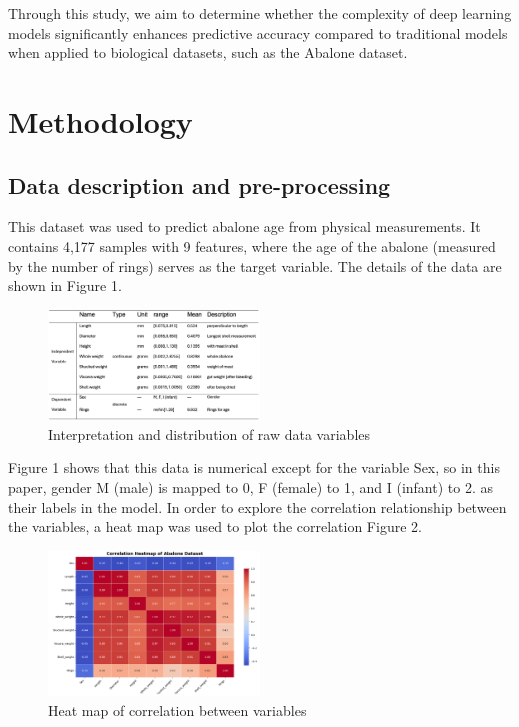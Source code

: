 \documentclass[conference]{IEEEtran}
\begin{document}
Through this study, we aim to determine whether the complexity of deep learning models significantly enhances predictive accuracy compared to traditional models when applied to biological datasets, such as the Abalone dataset.



\section{Methodology}

\subsection{Data description and pre-processing}

This dataset was used to predict abalone age from physical measurements. It contains 4,177 samples with 9 features, where the age of the abalone (measured by the number of rings) serves as the target variable. The details of the data are shown in Figure 1.


\begin{figure}[H]
    \centering
    \includegraphics[width=0.5\textwidth]{data_analysis1} %
    \caption{Interpretation and distribution of raw data variables}
    \label{fig:example1_image}
\end{figure}

Figure 1 shows that this data is numerical except for the variable Sex, so in this paper, gender M (male) is mapped to 0, F (female) to 1, and I (infant) to 2. as their labels in the model. In order to explore the correlation relationship between the variables, a heat map was used to plot the correlation Figure 2.

\begin{figure}[H]
    \centering
    \includegraphics[width=0.5\textwidth]{heatmap} %
    \caption{Heat map of correlation between variables}
    \label{fig:example2_image}
\end{figure}
\end{document}
